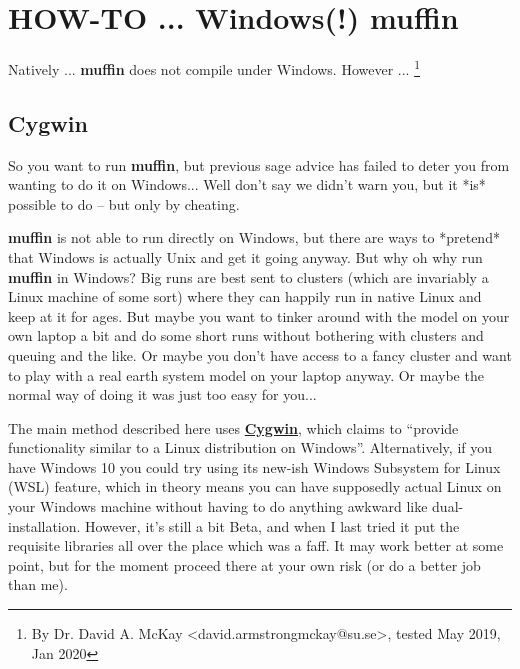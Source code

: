 \documentclass[11pt,fleqn]{book} %
\begin{document}

\newpage



\section{HOW-TO ... Windows(!) muffin}\label{how-to-redhat}
\vspace{2mm}


Natively ... \textbf{muffin} does not compile under Windows. However
... \footnote{By Dr. David A. McKay <david.armstrongmckay@su.se>,
  tested May 2019, Jan 2020 }

%
\subsection*{Cygwin}\label{cygwin}

So you want to run \textbf{muffin}, but previous sage advice has
failed to deter you from wanting to do it on Windows... Well don’t say
we didn’t warn you, but it *is* possible to do – but only by cheating.

\textbf{muffin} is not able to run directly on Windows, but there are
ways to *pretend* that Windows is actually Unix and get it going
anyway. But why oh why run \textbf{muffin} in Windows? Big runs are
best sent to clusters (which are invariably a Linux machine of some
sort) where they can happily run in native Linux and keep at it for
ages. But maybe you want to tinker around with the model on your own
laptop a bit and do some short runs without bothering with clusters
and queuing and the like. Or maybe you don’t have access to a fancy
cluster and want to play with a real earth system model on your laptop
anyway. Or maybe the normal way of doing it was just too easy for you...

The main method described here uses
\href{https://www.cygwin.com/faq.html#faq.what.what}{\textbf{Cygwin}},
which claims to ``provide functionality similar to a Linux
distribution on Windows''. Alternatively, if you have Windows 10 you
could try using its new-ish Windows Subsystem for Linux (WSL) feature,
which in theory means you can have supposedly actual Linux on your
Windows machine without having to do anything awkward like
dual-installation. However, it’s still a bit Beta, and when I last
tried it put the requisite libraries all over the place which was a
faff. It may work better at some point, but for the moment proceed
there at your own risk (or do a better job than me).
\end{document}
